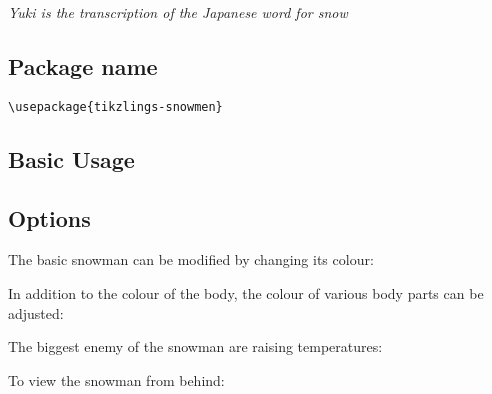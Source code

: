 \documentclass[parskip=half]{scrartcl}
\begin{document}
\emph{Yuki is the transcription of the Japanese word for snow}

\subsection{Package name}

\begin{tcolorbox}[lower separated=false, lefthand width=.8\linewidth]
\vspace*{0.5cm}
\lstinline|\usepackage{tikzlings-snowmen}| 
\vspace*{0.5cm}
\end{tcolorbox}

\subsection{Basic Usage}

\begin{tcblisting}{}
\snowman
\end{tcblisting}

\subsection{Options}

The basic snowman can be modified by changing its colour:
\begin{tcblisting}{}
\snowman[body=blue]
\end{tcblisting}

In addition to the colour of the body, the colour of various body parts can be adjusted:
\begin{tcblisting}{}
\snowman[eye=red]
\end{tcblisting}
\begin{tcblisting}{}
\snowman[nose=red]
\end{tcblisting}
\begin{tcblisting}{}
\snowman[mouth=red]
\end{tcblisting}
\begin{tcblisting}{}
\snowman[buttons=red]
\end{tcblisting}

The biggest enemy of the snowman are raising temperatures:
\begin{tcblisting}{}
\end{tcblisting}

To view the snowman from behind:
\begin{tcblisting}{}
\snowman[back]
\end{tcblisting}
\end{document}
